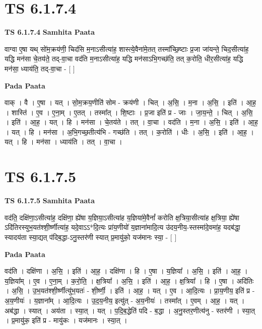 \documentclass[17pt]{extarticle}
\begin{document}

\section{ TS 6.1.7.4 }

\textbf{TS 6.1.7.4 } \newline
\textbf{Samhita Paata} \newline

वाग्वा ए॒षा यथ् सो॑म॒क्रय॑णी॒ चिद॑सि म॒नाऽसीत्या॑ह॒ शास्त्ये॒वैना॑मे॒तत् तस्मा᳚च्छि॒ष्टाः प्र॒जा जा॑यन्ते॒ चिद॒सीत्या॑ह॒ यद्धि मन॑सा चे॒तय॑ते॒ तद्-वा॒चा वद॑ति म॒नाऽसीत्या॑ह॒ यद्धि मन॑साऽभि॒गच्छ॑ति॒ तत् क॒रोति॒ धीर॒सीत्या॑ह॒ यद्धि मन॑सा॒ ध्याय॑ति॒ तद्-वा॒चा - [  ] \newline

\textbf{Pada Paata} \newline

वाक् । वै । ए॒षा । यत् । सो॒म॒क्रय॒णीति॑ सोम - क्रय॑णी । चित् । अ॒सि॒ । म॒ना । अ॒सि॒ । इति॑ । आ॒ह॒ । शास्ति॑ । ए॒व । ए॒ना॒म् । ए॒तत् । तस्मा᳚त् । शि॒ष्टाः । प्र॒जा इति॑ प्र - जाः । जा॒य॒न्ते॒ । चित् । अ॒सि॒ । इति॑ । आ॒ह॒ । यत् । हि । मन॑सा । चे॒तय॑ते । तत् । वा॒चा । वद॑ति । म॒ना । अ॒सि॒ । इति॑ । आ॒ह॒ । यत् । हि । मन॑सा । अ॒भि॒गच्छ॒तीत्य॑भि - गच्छ॑ति । तत् । क॒रोति॑ । धीः । अ॒सि॒ । इति॑ । आ॒ह॒ । यत् । हि । मन॑सा । ध्याय॑ति । तत् । वा॒चा ।  \newline





\section{ TS 6.1.7.5 }

\textbf{TS 6.1.7.5 } \newline
\textbf{Samhita Paata} \newline

वद॑ति॒ दक्षि॑णा॒ऽसीत्या॑ह॒ दक्षि॑णा॒ ह्ये॑षा य॒ज्ञिया॒ऽसीत्या॑ह य॒ज्ञिया॑मे॒वैनां᳚ करोति क्ष॒त्रिया॒सीत्या॑ह क्ष॒त्रिया॒ ह्ये॑षा ऽदि॑तिरस्युभ॒यत॑श्शी॒र्ष्णीत्या॑ह॒ यदे॒वाऽऽ*दि॒त्यः प्रा॑य॒णीयो॑ य॒ज्ञाना॑मादि॒त्य उ॑दय॒नीय॒-स्तस्मा॑दे॒वमा॑ह॒ यदब॑द्धा॒ स्यादय॑ता स्या॒द्यत् प॑दिब॒द्धा-ऽनु॒स्तर॑णी स्यात् प्र॒मायु॑को॒ यज॑मानः स्या॒ - [  ] \newline

\textbf{Pada Paata} \newline

वद॑ति । दक्षि॑णा । अ॒सि॒ । इति॑ । आ॒ह॒ । दक्षि॑णा । हि । ए॒षा । य॒ज्ञिया᳚ । अ॒सि॒ । इति॑ । आ॒ह॒ । य॒ज्ञिया᳚म् । ए॒व । ए॒ना॒म् । क॒रो॒ति॒ । क्ष॒त्रिया᳚ । अ॒सि॒ । इति॑ । आ॒ह॒ । क्ष॒त्रिया᳚ । हि । ए॒षा । अदि॑तिः । अ॒सि॒ । उ॒भ॒यत॑श्शी॒र्ष्णीत्यु॑भ॒यतः॑ - शी॒र्ष्णी॒ । इति॑ । आ॒ह॒ । यत् । ए॒व । आ॒दि॒त्यः । प्रा॒य॒णीय॒ इति॑ प्र - अ॒य॒णीयः॑ । य॒ज्ञाना᳚म् । आ॒दि॒त्यः । उ॒द॒य॒नीय॒ इत्यु॑त् - अ॒य॒नीयः॑ । तस्मा᳚त् । ए॒वम् । आ॒ह॒ । यत् । अब॑द्धा । स्यात् । अय॑ता । स्या॒त् । यत् । प॒दि॒ब॒द्धेति॑ पदि - ब॒द्धा । अ॒नु॒स्तर॒णीत्य॑नु - स्तर॑णी । स्या॒त् । प्र॒मायु॑क॒ इति॑ प्र - मायु॑कः । यज॑मानः । स्या॒त् ।  \newline
\end{document}
